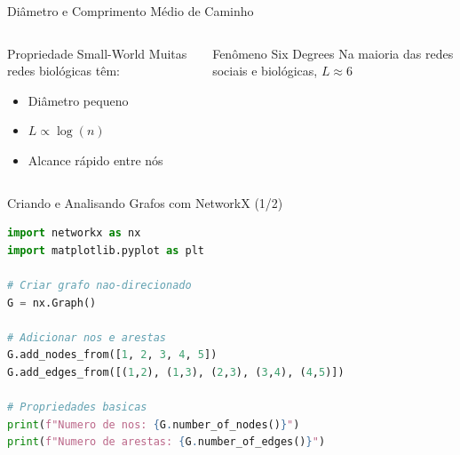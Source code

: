\begin{frame}[shrink=15]{Diâmetro e Comprimento Médio de Caminho}

\vspace{0.3cm}

\begin{columns}


\begin{exampleblock}{Propriedade Small-World}
Muitas redes biológicas têm:
\begin{itemize}
    \item Diâmetro pequeno
    \item $L \propto \log(n)$
    \item Alcance rápido entre nós
\end{itemize}
\end{exampleblock}

\begin{alertblock}{Fenômeno Six Degrees}
Na maioria das redes sociais e biológicas, $L \approx 6$
\end{alertblock}
\end{columns}
\end{frame}

\begin{frame}[fragile, shrink=5]{Criando e Analisando Grafos com NetworkX (1/2)}
\begin{lstlisting}[language=Python, caption=Exemplo básico com NetworkX, basicstyle=\ttfamily\footnotesize]
import networkx as nx
import matplotlib.pyplot as plt

# Criar grafo nao-direcionado
G = nx.Graph()

# Adicionar nos e arestas
G.add_nodes_from([1, 2, 3, 4, 5])
G.add_edges_from([(1,2), (1,3), (2,3), (3,4), (4,5)])

# Propriedades basicas
print(f"Numero de nos: {G.number_of_nodes()}")
print(f"Numero de arestas: {G.number_of_edges()}")
\end{lstlisting}
\end{frame}

